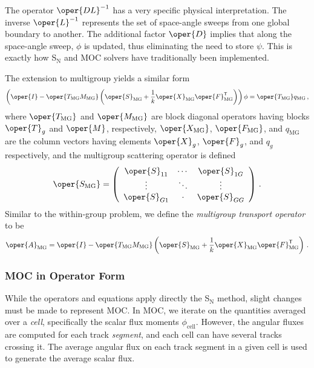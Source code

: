 The operator $\oper{DL}^{-1}$ has 
a very specific physical interpretation.  The inverse $\oper{L}^{-1}$
represents the set of space-angle sweeps from one global boundary 
to another.  The additional factor  $\oper{D}$ implies that along
the space-angle sweep, $\phi$ is updated, thus eliminating the 
need to store $\psi$.  This is exactly how S$_{\text{N}}$ and MOC solvers 
have traditionally been implemented.  

The extension to multigroup yields a similar form
\begin{equation}
   \left ( \oper{I} - \oper{T_{\text{MG}}M_{\text{MG}}} 
      \left ( \oper{S}_{\text{MG}} + 
              \frac{1}{k}\oper{X}_{\text{MG}} \oper{F}_{\text{MG}}^{\transp} 
      \right ) 
   \right ) \phi 
   =  \oper{T_{\text{MG}}}q_{\text{MG}} \, ,
\label{eq:mgteop}
\end{equation}
where $\oper{T_{\text{MG}}}$  and $\oper{M_{\text{MG}}}$ are  block 
diagonal operators
having blocks 
$\oper{T}_g$ and $\oper{M}$, 
respectively, 
$\oper{X_{\text{MG}}}$, $\oper{F_{\text{MG}}}$, and $q_{\text{MG}}$ 
are the 
column vectors having elements 
$\oper{X}_g$, $\oper{F}_g$, and $q_g$
respectively, and the multigroup scattering operator is defined
\begin{equation}
       \oper{S_{\text{MG}}} = 
           \left(
           \begin{array}{ccc}
              \oper{S}_{11} & \cdots & \oper{S}_{1G} \\
              \vdots           & \ddots & \vdots          \\
              \oper{S}_{G1} & \cdot   & \oper{S}_{GG}
           \end{array} 
           \right ) \, .
\label{eq:mgscatter}
\end{equation}
Similar to the within-group problem, we define the \emph{multigroup
transport operator} to be
\begin{equation}
 \oper{A}_{\text{MG}} =  \oper{I} - \oper{T_{\text{MG}}M_{\text{MG}}} 
      \left ( \oper{S}_{\text{MG}} + 
              \frac{1}{k}\oper{X}_{\text{MG}} \oper{F}_{\text{MG}}^{\transp} 
      \right ) \, .
 \label{eq:mgto}
\end{equation}

\subsubsection{MOC in Operator Form}

While the operators and equations apply directly the S$_{\text{N}}$ method,
slight changes must be made to represent MOC. In MOC, we iterate on the 
quantities averaged over a \emph{cell},
specifically the scalar flux moments $\phi_{\text{cell}}$.  However, the
angular fluxes are computed for each track \emph{segment}, and each cell 
can have several tracks crossing it.  The average angular flux on each 
track segment in a given cell is used to generate the average scalar flux.

